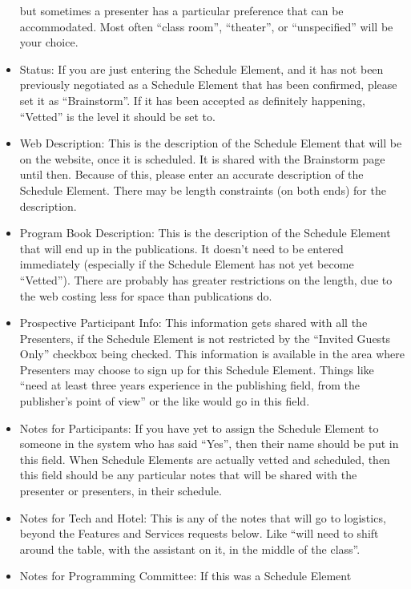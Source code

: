 \documentclass[tablesignature]{scrartcl}
\begin{document}
\begin{itemize}
     but sometimes a presenter has a particular preference that can
     be accommodated.  Most often ``class room'', ``theater'', or
     ``unspecified'' will be your choice.
\item Status: If you are just entering the Schedule Element, and it has
     not been previously negotiated as a Schedule Element that has
     been confirmed, please set it as ``Brainstorm''.  If it has been
     accepted as definitely happening, ``Vetted'' is the level it should
     be set to.
\item Web Description: This is the description of the Schedule Element
     that will be on the website, once it is scheduled. It is shared
     with the Brainstorm page until then. Because of this, please
     enter an accurate description of the Schedule Element.  There may
     be length constraints (on both ends) for the description.
\item Program Book Description: This is the description of the Schedule
     Element that will end up in the publications.  It doesn't need to
     be entered immediately (especially if the Schedule Element has
     not yet become ``Vetted''). There are probably has greater
     restrictions on the length, due to the web costing less for space
     than publications do.
\item Prospective Participant Info: This information gets shared with
     all the Presenters, if the Schedule Element is not restricted by
     the ``Invited Guests Only'' checkbox being checked.  This
     information is available in the area where Presenters may choose
     to sign up for this Schedule Element.  Things like ``need at least
     three years experience in the publishing field, from the
     publisher's point of view'' or the like would go in this field.
\item Notes for Participants: If you have yet to assign the Schedule
     Element to someone in the system who has said ``Yes'', then their
     name should be put in this field.  When Schedule Elements are
     actually vetted and scheduled, then this field should be any
     particular notes that will be shared with the presenter or
     presenters, in their schedule.
\item Notes for Tech and Hotel: This is any of the notes that will go
     to logistics, beyond the Features and Services requests below.
     Like ``will need to shift around the table, with the assistant on
     it, in the middle of the class''.
\item Notes for Programming Committee: If this was a Schedule Element

\end{itemize}
\end{document}
